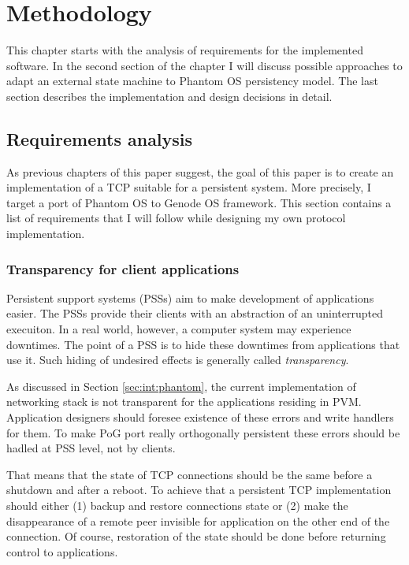 \chapter{Methodology}
\label{chap:meth}

This chapter starts with the analysis of requirements for the implemented
software. In the second section of the chapter I will discuss possible
approaches to adapt an external state machine to Phantom OS persistency model.
The last section describes the implementation and design decisions in detail.

\section {Requirements analysis}
\label{sec:meth:req}

As previous chapters of this paper suggest, the goal of this paper is to create
an implementation of a TCP suitable for a persistent system. More precisely, I
target a port of Phantom OS to Genode OS framework. This section contains a
list of requirements that I will follow while designing my own protocol
implementation.

\subsection {Transparency for client applications}
Persistent support systems (PSSs) aim to make development of applications
easier. The PSSs provide their clients with an abstraction of an uninterrupted
execuiton. In a real world, however, a computer system may experience
downtimes. The point of a PSS is to hide these downtimes from applications that
use it. Such hiding of undesired effects is generally called
\textit{transparency}.

As discussed in Section \ref{sec:int:phantom}, the current implementation of
networking stack is not transparent for the applications residing in PVM.
Application designers should foresee existence of these errors and write
handlers for them. To make PoG port really orthogonally persistent these errors
should be hadled at PSS level, not by clients.

That means that the state of TCP connections should be the same before a
shutdown and after a reboot. To achieve that a persistent TCP implementation
should either (1) backup and restore connections state or (2) make the
disappearance of a remote peer invisible for application on the other end of
the connection. Of course, restoration of the state should be done before
returning control to applications.

